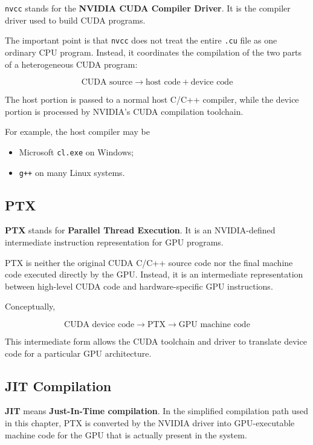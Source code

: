 \documentclass[11pt,a4paper]{article}
\begin{document}
\texttt{nvcc} stands for the \textbf{NVIDIA CUDA Compiler Driver}. It is the compiler driver used to build CUDA programs.

The important point is that \texttt{nvcc} does not treat the entire \texttt{.cu} file as one ordinary CPU program. Instead, it coordinates the compilation of the two parts of a heterogeneous CUDA program:

\[
\boxed{
\text{CUDA source}
\rightarrow
\text{host code}
+
\text{device code}
}
\]

The host portion is passed to a normal host C/C++ compiler, while the device portion is processed by NVIDIA's CUDA compilation toolchain.

For example, the host compiler may be

\begin{itemize}
    \item Microsoft \texttt{cl.exe} on Windows;
    \item \texttt{g++} on many Linux systems.
\end{itemize}

\subsection{PTX}

\textbf{PTX} stands for \textbf{Parallel Thread Execution}. It is an NVIDIA-defined intermediate instruction representation for GPU programs.

PTX is neither the original CUDA C/C++ source code nor the final machine code executed directly by the GPU. Instead, it is an intermediate representation between high-level CUDA code and hardware-specific GPU instructions.

Conceptually,

\[
\boxed{
\text{CUDA device code}
\rightarrow
\text{PTX}
\rightarrow
\text{GPU machine code}
}
\]

This intermediate form allows the CUDA toolchain and driver to translate device code for a particular GPU architecture.

\subsection{JIT Compilation}

\textbf{JIT} means \textbf{Just-In-Time compilation}. In the simplified compilation path used in this chapter, PTX is converted by the NVIDIA driver into GPU-executable machine code for the GPU that is actually present in the system.
\end{document}
